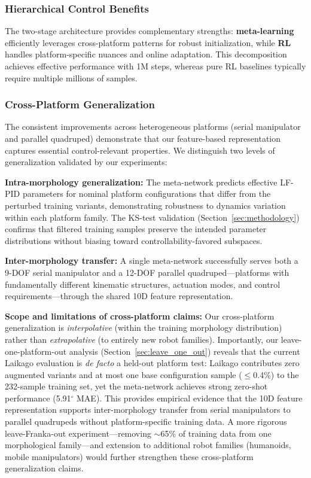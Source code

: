 \documentclass[DTMColor]{ROB-New}
\begin{document}
\subsubsection{Hierarchical Control Benefits}

The two-stage architecture provides complementary strengths: \textbf{meta-learning} efficiently leverages cross-platform patterns for robust initialization, while \textbf{RL} handles platform-specific nuances and online adaptation. This decomposition achieves effective performance with 1M steps, whereas pure RL baselines typically require multiple millions of samples.

\subsubsection{Cross-Platform Generalization}

The consistent improvements across heterogeneous platforms (serial manipulator and parallel quadruped) demonstrate that our feature-based representation captures essential control-relevant properties. We distinguish two levels of generalization validated by our experiments:

\textbf{Intra-morphology generalization:} The meta-network predicts effective LF-PID parameters for nominal platform configurations that differ from the perturbed training variants, demonstrating robustness to dynamics variation within each platform family. The KS-test validation (Section~\ref{sec:methodology}) confirms that filtered training samples preserve the intended parameter distributions without biasing toward controllability-favored subspaces.

\textbf{Inter-morphology transfer:} A single meta-network successfully serves both a 9-DOF serial manipulator and a 12-DOF parallel quadruped---platforms with fundamentally different kinematic structures, actuation modes, and control requirements---through the shared 10D feature representation.

{\color{blue}\textbf{Scope and limitations of cross-platform claims:} Our cross-platform generalization is \textit{interpolative} (within the training morphology distribution) rather than \textit{extrapolative} (to entirely new robot families). Importantly, our leave-one-platform-out analysis (Section~\ref{sec:leave_one_out}) reveals that the current Laikago evaluation is \textit{de facto} a held-out platform test: Laikago contributes zero augmented variants and at most one base configuration sample ($\leq$0.4\%) to the 232-sample training set, yet the meta-network achieves strong zero-shot performance (5.91$^\circ$ MAE). This provides empirical evidence that the 10D feature representation supports inter-morphology transfer from serial manipulators to parallel quadrupeds without platform-specific training data. A more rigorous leave-Franka-out experiment---removing $\sim$65\% of training data from one morphological family---and extension to additional robot families (humanoids, mobile manipulators) would further strengthen these cross-platform generalization claims.}
\end{document}
